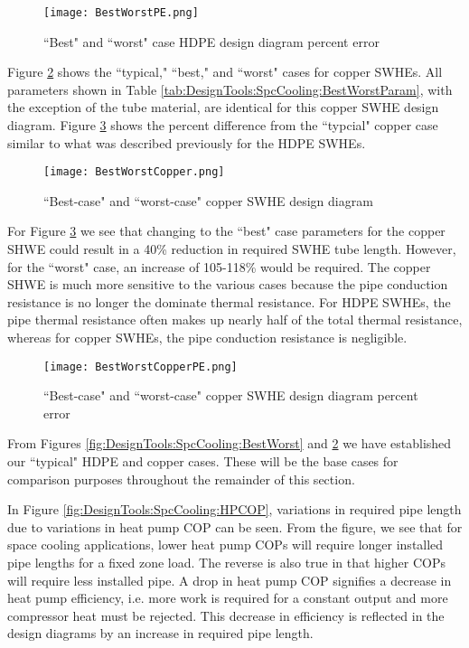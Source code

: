 	\begin{figure}
		\centering
		\texttt{[image: BestWorstPE.png]}
		\caption{``Best" and ``worst" case HDPE design diagram percent error}
		\label{fig:DesignTools:SpcCooling:BestWorstPE}
	\end{figure}
	
Figure \ref{fig:DesignTools:SpcCooling:BestWorstCopper} shows the ``typical," ``best," and ``worst" cases for copper SWHEs. All parameters shown in Table \ref{tab:DesignTools:SpcCooling:BestWorstParam}, with the exception of the tube material, are identical for this copper SWHE design diagram. Figure \ref{fig:DesignTools:SpcCooling:BestWorstCopperPE} shows the percent difference from the ``typcial" copper case similar to what was described previously for the HDPE SWHEs.
	
	\begin{figure}
		\centering
		\texttt{[image: BestWorstCopper.png]}
		\caption{``Best-case" and ``worst-case" copper SWHE design diagram}
		\label{fig:DesignTools:SpcCooling:BestWorstCopper}
	\end{figure}
	
For Figure \ref{fig:DesignTools:SpcCooling:BestWorstCopperPE} we see that changing to the ``best" case parameters for the copper SHWE could result in a 40\% reduction in required SWHE tube length. However, for the ``worst" case, an increase of 105-118\% would be required. The copper SHWE is much more sensitive to the various cases because the pipe conduction resistance is no longer the dominate thermal resistance. For HDPE SWHEs, the pipe thermal resistance often makes up nearly half of the total thermal resistance, whereas for copper SWHEs, the pipe conduction resistance is negligible.
	
	\begin{figure}
		\centering
		\texttt{[image: BestWorstCopperPE.png]}
		\caption{``Best-case" and ``worst-case" copper SWHE design diagram percent error}
		\label{fig:DesignTools:SpcCooling:BestWorstCopperPE}
	\end{figure}

From Figures \ref{fig:DesignTools:SpcCooling:BestWorst} and \ref{fig:DesignTools:SpcCooling:BestWorstCopper} we have established our ``typical" HDPE and copper cases. These will be the base cases for comparison purposes throughout the remainder of this section.


In Figure \ref{fig:DesignTools:SpcCooling:HPCOP}, variations in required pipe length due to variations in heat pump COP can be seen. From the figure, we see that for space cooling applications, lower heat pump COPs will require longer installed pipe lengths for a fixed zone load. The reverse is also true in that higher COPs will require less installed pipe. A drop in heat pump COP signifies a decrease in heat pump efficiency, i.e. more work is required for a constant output and more compressor heat must be rejected. This decrease in efficiency is reflected in the design diagrams by an increase in required pipe length.

